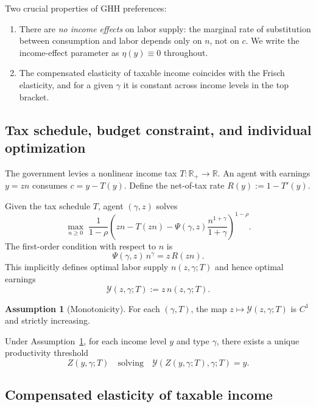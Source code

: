 \documentclass[12pt,a4paper]{article}
\theoremstyle{definition}
\newtheorem{assumption}{Assumption}[section]
\theoremstyle{plain}
\theoremstyle{remark}
\newcommand{\R}{\mathbb{R}}
\newcommand{\calY}{\mathcal{Y}}
\begin{document}
Two crucial properties of GHH preferences:
\begin{enumerate}[label=(\roman*)]
  \item There are \emph{no income effects} on labor supply: the marginal rate of substitution between consumption and labor depends only on $n$, not on $c$.  We write the income-effect parameter as $\eta(y) \equiv 0$ throughout.
  \item The compensated elasticity of taxable income coincides with the Frisch elasticity, and for a given $\gamma$ it is constant across income levels in the top bracket.
\end{enumerate}

\subsection{Tax schedule, budget constraint, and individual optimization}

The government levies a nonlinear income tax $T: \R_+ \to \R$.  An agent with earnings $y = zn$ consumes $c = y - T(y)$.  Define the net-of-tax rate $R(y) := 1 - T'(y)$.

Given the tax schedule $T$, agent $(\gamma,z)$ solves
\[
  \max_{n \geq 0}\; \frac{1}{1-\rho}\left(zn - T(zn) - \Psi(\gamma,z)\frac{n^{1+\gamma}}{1+\gamma}\right)^{1-\rho}.
\]
The first-order condition with respect to $n$ is
\begin{equation}
\label{eq:FOC_2D}
  \Psi(\gamma,z)\,n^{\gamma} = z\,R(zn).
\end{equation}
This implicitly defines optimal labor supply $n(z,\gamma;T)$ and hence optimal earnings
\begin{equation}
\label{eq:Y_map_2D}
  \calY(z,\gamma;T) := z\,n(z,\gamma;T).
\end{equation}

\begin{assumption}[Monotonicity]
\label{as:2D_monotone}
For each $(\gamma,T)$, the map $z \mapsto \calY(z,\gamma;T)$ is $C^1$ and strictly increasing.
\end{assumption}

Under Assumption~\ref{as:2D_monotone}, for each income level $y$ and type $\gamma$, there exists a unique productivity threshold
\begin{equation}
\label{eq:Z_inverse_2D}
  Z(y,\gamma;T) \quad \text{solving} \quad \calY(Z(y,\gamma;T),\gamma;T) = y.
\end{equation}

\subsection{Compensated elasticity of taxable income}
\label{sec:2D_ETI}
\end{document}
